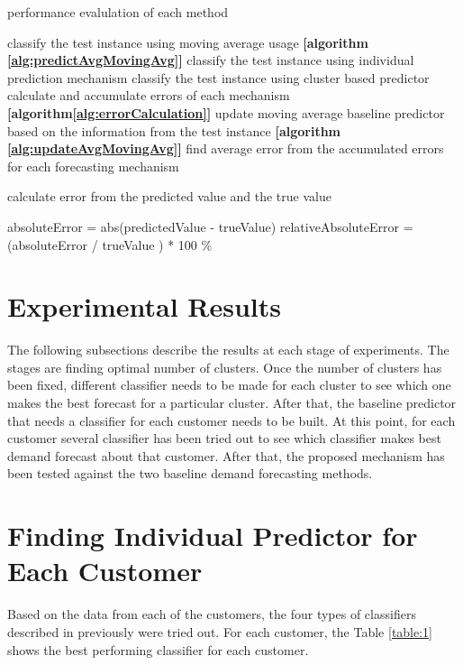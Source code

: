 \begin{algorithm}
\caption{performance evalulation of each method}
\begin{algorithmic} [1]
    \STATE classify the test instance using moving average usage \textbf{[algorithm \ref{alg:predictAvgMovingAvg}]}
    \STATE classify the test instance using individual prediction mechanism
    \STATE classify the test instance using cluster based predictor
    \STATE calculate and accumulate errors of each mechanism \textbf{[algorithm\ref{alg:errorCalculation}]}
    \STATE update moving average baseline predictor based on the information from the test instance \textbf{[algorithm \ref{alg:updateAvgMovingAvg}]}
\ENDFOR 
\STATE find average error from the accumulated errors for each forecasting mechanism
\end{algorithmic}
\label{alg:performanceEval}
\end{algorithm}
\begin{algorithm} [!h]
\caption{calculate error from the predicted value and the true value}
\begin{algorithmic} [1]
\STATE absoluteError = abs(predictedValue - trueValue)
\STATE relativeAbsoluteError = (absoluteError / trueValue ) * 100 \%
\end{algorithmic}
\label{alg:errorCalculation}
\end{algorithm}

\section{Experimental Results}

The following subsections describe the results at each stage of experiments. The stages are finding optimal number of clusters. Once the number of clusters has been fixed, different classifier needs to be made for each cluster to see which one makes the best forecast for a particular cluster. After that, the baseline predictor that needs a classifier for each customer needs to be built. At this point, for each customer several classifier has been tried out to see which classifier makes best demand forecast about that customer. After that, the proposed mechanism has been tested against the two baseline demand forecasting methods.

\section{Finding Individual Predictor for Each Customer}
Based on the data from each of the customers, the four types of classifiers described in previously were tried out. For each customer, the Table \ref{table:1} shows the best performing classifier for each customer. 

